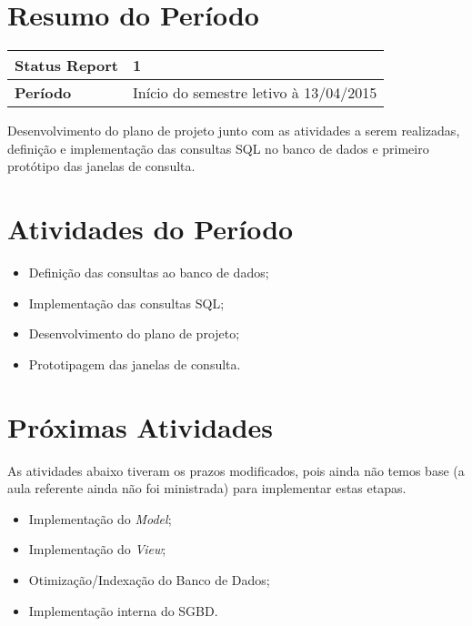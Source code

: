 \documentclass[a4paper,12pt]{article}
\begin{document}

\newpage

\section{Resumo do Período}

\begin{longtable}{|l|l|}
\hline
\textbf{Status Report} & 1\\
\hline
\textbf{Período}	&	Início do semestre letivo à 13/04/2015 \\
\hline
\end{longtable}

Desenvolvimento do plano de projeto junto com as atividades a serem realizadas, definição e implementação das consultas SQL no banco de dados e primeiro protótipo das janelas de consulta.

\section{Atividades do Período}

\begin{itemize}

\item{Definição das consultas ao banco de dados;}
\item{Implementação das consultas SQL;}
\item{Desenvolvimento do plano de projeto;}
\item{Prototipagem das janelas de consulta.}


\end{itemize}

\section{Próximas Atividades}

As atividades abaixo tiveram os prazos modificados, pois ainda não temos base (a aula referente ainda não foi ministrada) para implementar estas etapas.

\begin{itemize}

\item{Implementação do \textit{Model};}
\item{Implementação do \textit{View};}
\item{Otimização/Indexação do Banco de Dados;}
\item{Implementação interna do SGBD.}

\end{itemize}
\end{document}
